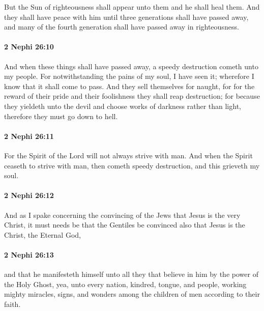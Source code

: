 			But the Sun of righteousness shall appear unto them and he shall heal them.
			And they shall have peace with him until three generations shall have passed away,
			and many of the fourth generation shall have passed away in righteousness.

		\paragraph{2 Nephi 26:10} %
			\label{2NEPHI-26-10}

			And when these things shall have passed away,
			a speedy destruction cometh unto my people.
			For notwithstanding the pains of my soul, I have seen it;
			wherefore I know that it shall come to pass.
			And they sell themselves for naught,
			for for the reward of their pride and their foolishness they shall reap destruction;
			for because they yieldeth unto the devil
			and choose works of darkness rather than light,
			therefore they must go down to hell.

		\paragraph{2 Nephi 26:11} %
			\label{2NEPHI-26-11}

			For the Spirit of the Lord will not always strive with man.
			And when the Spirit ceaseth to strive with man, then cometh speedy destruction,
			and this grieveth my soul.

		\paragraph{2 Nephi 26:12} %
			\label{2NEPHI-26-12}

			And as I spake concerning the convincing of the Jews
			that Jesus is the very Christ,
			it must needs be that the Gentiles be convinced also
			that Jesus is the Christ, the Eternal God,

		\paragraph{2 Nephi 26:13} %
			\label{2NEPHI-26-13}

			and that he manifesteth himself unto all they that believe in him
			by the power of the Holy Ghost,
			yea, unto every nation, kindred, tongue, and people,
			working mighty miracles, signs, and wonders
			among the children of men according to their faith.

